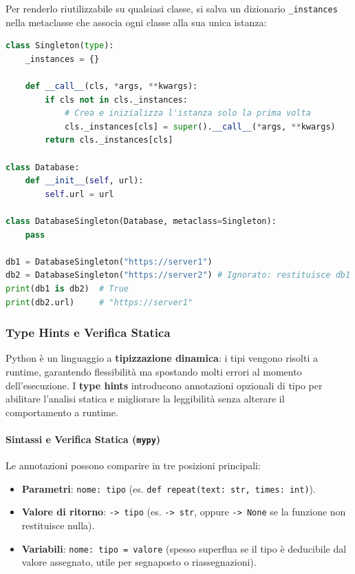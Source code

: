 \documentclass[12pt]{extarticle}
\begin{document}
Per renderlo riutilizzabile su qualsiasi classe, si salva un dizionario \texttt{\_instances} nella metaclasse che associa ogni classe alla sua unica istanza:

\begin{lstlisting}[language=Python]
class Singleton(type):
    _instances = {}

    def __call__(cls, *args, **kwargs):
        if cls not in cls._instances:
            # Crea e inizializza l'istanza solo la prima volta
            cls._instances[cls] = super().__call__(*args, **kwargs)
        return cls._instances[cls]

class Database:
    def __init__(self, url):
        self.url = url

class DatabaseSingleton(Database, metaclass=Singleton):
    pass

db1 = DatabaseSingleton("https://server1")
db2 = DatabaseSingleton("https://server2") # Ignorato: restituisce db1
print(db1 is db2)  # True
print(db2.url)     # "https://server1"
\end{lstlisting}

\subsubsection{Type Hints e Verifica Statica}

Python è un linguaggio a \textbf{tipizzazione dinamica}: i tipi vengono risolti a runtime, garantendo flessibilità ma spostando molti errori al momento dell'esecuzione. I \textbf{type hints} introducono annotazioni opzionali di tipo per abilitare l'analisi statica e migliorare la leggibilità senza alterare il comportamento a runtime.

\paragraph{Sintassi e Verifica Statica (\texttt{mypy})}
Le annotazioni possono comparire in tre posizioni principali:
\begin{itemize}
\item \textbf{Parametri}: \texttt{nome: tipo} (es. \texttt{def repeat(text: str, times: int)}).
\item \textbf{Valore di ritorno}: \texttt{-> tipo} (es. \texttt{-> str}, oppure \texttt{-> None} se la funzione non restituisce nulla).
\item \textbf{Variabili}: \texttt{nome: tipo = valore} (spesso superflua se il tipo è deducibile dal valore assegnato, utile per segnaposto o riassegnazioni).
\end{itemize}
\end{document}
